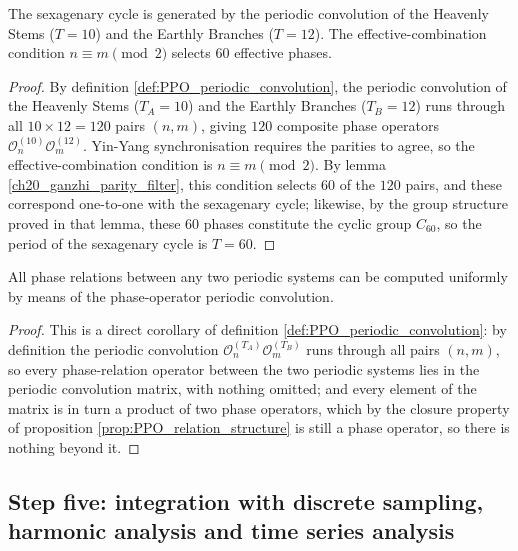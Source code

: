 \begin{theorem}\label{thm:ganzhi_periodic_convolution}
The sexagenary cycle is generated by the periodic convolution of the Heavenly Stems ($T=10$) and the Earthly Branches ($T=12$). The effective-combination condition $n \equiv m \pmod{2}$ selects $60$ effective phases.
\end{theorem}

\begin{proof}
By definition \ref{def:PPO_periodic_convolution}, the periodic convolution of the Heavenly Stems ($T_A = 10$) and the Earthly Branches ($T_B = 12$) runs through all $10 \times 12 = 120$ pairs $(n,m)$, giving $120$ composite phase operators $\mathcal{O}_n^{(10)} \mathcal{O}_m^{(12)}$. Yin-Yang synchronisation requires the parities to agree, so the effective-combination condition is $n \equiv m \pmod 2$. By lemma \ref{ch20_ganzhi_parity_filter}, this condition selects $60$ of the $120$ pairs, and these correspond one-to-one with the sexagenary cycle; likewise, by the group structure proved in that lemma, these $60$ phases constitute the cyclic group $C_{60}$, so the period of the sexagenary cycle is $T = 60$.
\end{proof}

\begin{corollary}\label{cor:all_periods_periodic_conv}
All phase relations between any two periodic systems can be computed uniformly by means of the phase-operator periodic convolution.
\end{corollary}

\begin{proof}
This is a direct corollary of definition \ref{def:PPO_periodic_convolution}: by definition the periodic convolution $\mathcal{O}_n^{(T_A)} \mathcal{O}_m^{(T_B)}$ runs through all pairs $(n,m)$, so every phase-relation operator between the two periodic systems lies in the periodic convolution matrix, with nothing omitted; and every element of the matrix is in turn a product of two phase operators, which by the closure property of proposition \ref{prop:PPO_relation_structure} is still a phase operator, so there is nothing beyond it.
\end{proof}

\subsection{Step five: integration with discrete sampling, harmonic analysis and time series analysis}

